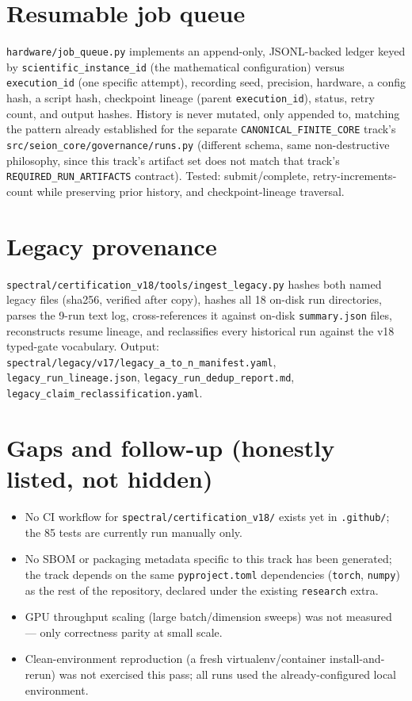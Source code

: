 \documentclass[11pt]{amsart}
\begin{document}
\section{Resumable job queue}
\texttt{hardware/job\_queue.py} implements an append-only, JSONL-backed
ledger keyed by \texttt{scientific\_instance\_id} (the mathematical
configuration) versus \texttt{execution\_id} (one specific attempt),
recording seed, precision, hardware, a config hash, a script hash,
checkpoint lineage (parent \texttt{execution\_id}), status, retry count,
and output hashes. History is never mutated, only appended to, matching
the pattern already established for the separate \texttt{CANONICAL\_FINITE\_CORE}
track's \texttt{src/seion\_core/governance/runs.py} (different schema,
same non-destructive philosophy, since this track's artifact set does not
match that track's \texttt{REQUIRED\_RUN\_ARTIFACTS} contract). Tested:
submit/complete, retry-increments-count while preserving prior history,
and checkpoint-lineage traversal.

\section{Legacy provenance}
\texttt{spectral/certification\_v18/tools/ingest\_legacy.py} hashes both
named legacy files (sha256, verified after copy), hashes all 18 on-disk
run directories, parses the 9-run text log, cross-references it against
on-disk \texttt{summary.json} files, reconstructs resume lineage, and
reclassifies every historical run against the v18 typed-gate vocabulary.
Output: \texttt{spectral/legacy/v17/legacy\_a\_to\_n\_manifest.yaml},
\texttt{legacy\_run\_lineage.json}, \texttt{legacy\_run\_dedup\_report.md},
\texttt{legacy\_claim\_reclassification.yaml}.

\section{Gaps and follow-up (honestly listed, not hidden)}
\label{sec:gaps}
\begin{itemize}[leftmargin=*]
\item No CI workflow for \texttt{spectral/certification\_v18/} exists yet
  in \texttt{.github/}; the 85 tests are currently run manually only.
\item No SBOM or packaging metadata specific to this track has been
  generated; the track depends on the same \texttt{pyproject.toml}
  dependencies (\texttt{torch}, \texttt{numpy}) as the rest of the
  repository, declared under the existing \texttt{research} extra.
\item GPU throughput scaling (large batch/dimension sweeps) was not
  measured --- only correctness parity at small scale.
\item Clean-environment reproduction (a fresh virtualenv/container
  install-and-rerun) was not exercised this pass; all runs used the
  already-configured local environment.
\end{itemize}
\end{document}
